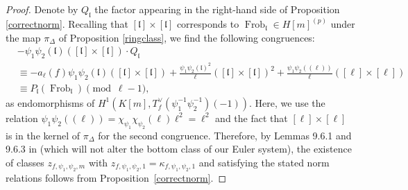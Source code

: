 \documentclass[10pt,letterpaper]{amsart}
\theoremstyle{plain}
\theoremstyle{definition}
\theoremstyle{definition}
\theoremstyle{plain}
\theoremstyle{plain}
\theoremstyle{plain}
\theoremstyle{remark}
\numberwithin{equation}{section}
\newcommand{\fkl}{\mathfrak{l}}
\DeclareMathOperator{\Frob}{\mathrm{Frob}}
\begin{document}
\begin{proof}
Denote by $Q_\fkl$ the factor appearing in the right-hand side of Proposition \ref{correctnorm}. Recalling that $[\fkl]\times[\fkl]$ corresponds to $\Frob_\fkl\in H[m]^{(p)}$ under the map $\pi_\Delta$ of Proposition \ref{ringclass}, we find the following congruences:
\begin{align*}
&-\psi_1\psi_2(\fkl)([\fkl]\times [\fkl])\cdot Q_{\fkl}\\
&\equiv
-a_\ell(f)\psi_1\psi_2(\fkl)([\fkl]\times[\fkl])+\frac{\psi_1\psi_2(\fkl)^2}{\ell}([\fkl]\times[\fkl])^2+\frac{\psi_1\psi_2((\ell))}{\ell}([\ell]\times[\ell])\\
&\equiv P_\fkl(\Frob_\fkl)\pmod{\ell-1},
\end{align*}
 as endomorphisms of $H^1(K[m],T_f^{\vee}(\psi_{1}^{-1}\psi_{2}^{-1})(-1))$. Here, we use the relation $\psi_1\psi_2((\ell))=\chi_{\psi_1}\chi_{\psi_2}(\ell)\ell^2=\ell^2$ and the fact that $[\ell]\times[\ell]$ is in the kernel of $\pi_\Delta$ for the second congruence. Therefore, by Lemmas 9.6.1 and 9.6.3 in \cite{Rubin-ES} (which will not alter the bottom class of our Euler system), the existence of classes $z_{f,\psi_1,\psi_2,m}$ with $z_{f,\psi_1,\psi_2,1}=\kappa_{f,\psi_1,\psi_2,1}$ and satisfying the stated norm relations follows from Proposition~\ref{correctnorm}. 
\end{proof}
\end{document}
